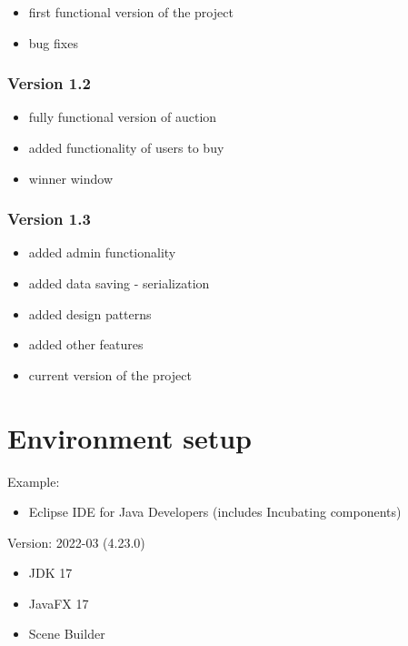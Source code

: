 \documentclass[
]{report}
\providecommand{\tightlist}{%
  \setlength{\itemsep}{0pt}\setlength{\parskip}{0pt}}
\begin{document}
\begin{itemize}
\tightlist
\item
  first functional version of the project
\item
  bug fixes
\end{itemize}

\hypertarget{version-1.2}{%
\subsection{Version 1.2}\label{version-1.2}}

\begin{itemize}
\tightlist
\item
  fully functional version of auction
\item
  added functionality of users to buy
\item
  winner window
\end{itemize}

\hypertarget{version-1.3}{%
\subsection{Version 1.3}\label{version-1.3}}

\begin{itemize}
\tightlist
\item
  added admin functionality
\item
  added data saving - serialization
\item
  added design patterns
\item
  added other features
\item
  current version of the project
\end{itemize}

\hypertarget{environment-setup}{%
\chapter{Environment setup}\label{environment-setup}}

Example:

\begin{itemize}
\tightlist
\item
  Eclipse IDE for Java Developers (includes Incubating components)
\end{itemize}

Version: 2022-03 (4.23.0)

\begin{itemize}
\tightlist
\item
  JDK 17
\item
  JavaFX 17
\item
  Scene Builder
\end{itemize}
\end{document}
